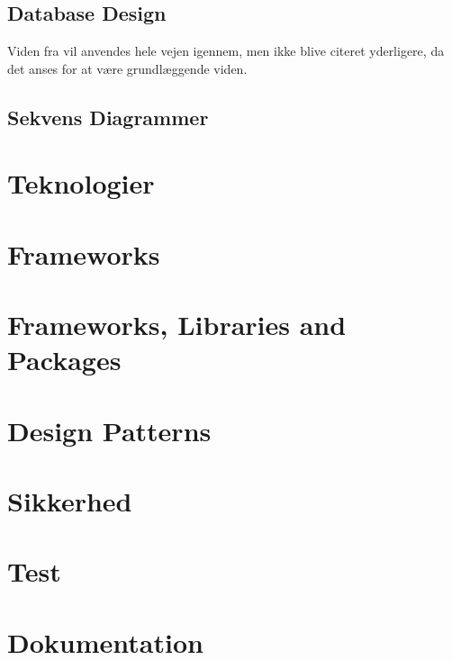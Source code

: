 \subsection{Database Design}
Viden fra \cite{connolly2023database} vil anvendes hele vejen igennem, men ikke blive citeret yderligere, da det anses for at være grundlæggende viden.

\subsection{Sekvens Diagrammer}

\section{Teknologier}

\section{Frameworks}

\section{Frameworks, Libraries and Packages}



\section{Design Patterns}

\section{Sikkerhed}

\section{Test}

\section{Dokumentation}